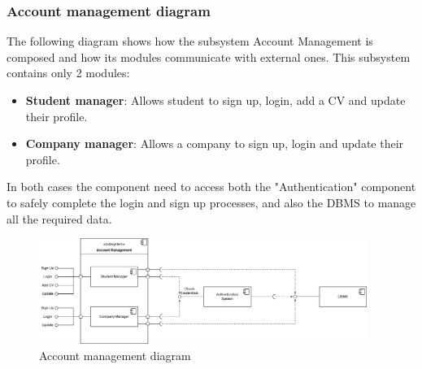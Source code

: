 \documentclass[11pt,twoside]{article}
\begin{document}
		\subsubsection{Account management diagram}
The following diagram shows how the subsystem Account Management is composed and how its modules communicate with external ones. This subsystem contains only 2 modules:
\begin{itemize}
\item \textbf{Student manager}: Allows student to sign up, login, add a CV and update their profile.
\item \textbf{Company manager}: Allows a company to sign up, login and update their profile.
\end{itemize}
In both cases the component need to access both the "Authentication" component to safely complete the login and sign up processes, and also the DBMS to manage all the required data.

\begin{figure}[H]
\centering
\includegraphics[width=0.95\textwidth]{Images/Component3}
\caption{Account management diagram}\label{Component3}
\end{figure}

\newpage
\end{document}
